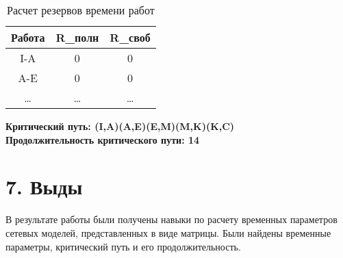\documentclass[12pt]{article}
\begin{document}
\begin{table}[H]
    \centering
    \begin{tabular}{|c|c|c|}
        \hline
        Работа & R\_полн & R\_своб \\
        \hline
        I-A & 0 & 0 \\
        \hline
        A-E & 0 & 0 \\
        \hline
        \ldots & \ldots & \ldots \\
        \hline
    \end{tabular}
    \caption{Расчет резервов времени работ}
\end{table}

\textbf{Критический путь: (I,A)(A,E)(E,M)(M,K)(K,C)} \\
\textbf{Продолжительность критического пути: 14}

\section*{7. Выды}
В результате работы были получены навыки по расчету временных параметров сетевых моделей, представленных в виде матрицы. Были найдены временные параметры, критический путь и его продолжительность.
\end{document}
